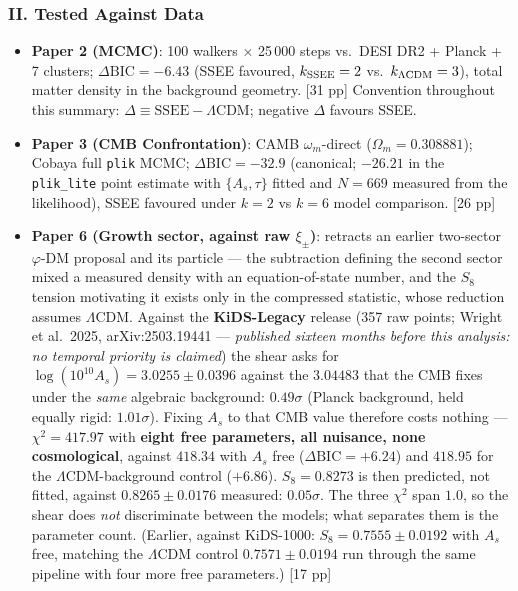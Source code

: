 \documentclass[11pt,a4paper]{article}
\begin{document}
\subsubsection*{II. Tested Against Data}
\begin{itemize}
  \item \textbf{Paper 2 (MCMC)}: 100 walkers $\times$ 25\,000 steps vs.\ DESI DR2 + Planck + 7 clusters; $\Delta\text{BIC}=-6.43$ (SSEE favoured, $k_{\rm SSEE}=2$ vs.\ $k_{\Lambda\rm CDM}=3$), total matter density in the background geometry. [31 pp] Convention throughout this summary: $\Delta\equiv\mathrm{SSEE}-\Lambda\mathrm{CDM}$; negative $\Delta$ favours SSEE.
  \item \textbf{Paper 3 (CMB Confrontation)}: CAMB $\omega_m$-direct ($\Omega_m=0.308881$); Cobaya full \texttt{plik} MCMC; $\Delta\mathrm{BIC}=-32.9$ (canonical; $-26.21$ in the \texttt{plik\_lite} point estimate with $\{A_s,\tau\}$ fitted and $N=669$ measured from the likelihood), SSEE favoured under $k=2$ vs $k=6$ model comparison. [26 pp]
  \item \textbf{Paper 6 (Growth sector, against raw $\xi_\pm$)}: retracts an
  earlier two-sector $\varphi$-DM proposal and its particle --- the subtraction
  defining the second sector mixed a measured density with an
  equation-of-state number, and the $S_8$ tension motivating it exists only in
  the compressed statistic, whose reduction assumes $\Lambda$CDM. Against the
  \textbf{KiDS-Legacy} release (357 raw points; Wright et al.\ 2025,
  arXiv:2503.19441 --- \emph{published sixteen months before this analysis: no
  temporal priority is claimed}) the shear asks for
  $\log(10^{10}A_s)=3.0255\pm0.0396$ against the $3.04483$ that the CMB fixes
  under the \emph{same} algebraic background: $0.49\sigma$ (Planck background,
  held equally rigid: $1.01\sigma$). Fixing $A_s$ to that CMB value therefore
  costs nothing --- $\chi^2=417.97$ with \textbf{eight free parameters, all
  nuisance, none cosmological}, against $418.34$ with $A_s$ free
  ($\Delta\mathrm{BIC}=+6.24$) and $418.95$ for the $\Lambda$CDM-background
  control ($+6.86$). $S_8=0.8273$ is then predicted, not fitted, against
  $0.8265\pm0.0176$ measured: $0.05\sigma$. The three $\chi^2$ span $1.0$, so
  the shear does \emph{not} discriminate between the models; what separates
  them is the parameter count. (Earlier, against KiDS-1000: $S_8=0.7555\pm0.0192$
  with $A_s$ free, matching the $\Lambda$CDM control $0.7571\pm0.0194$ run
  through the same pipeline with four more free parameters.) [17 pp]
\end{itemize}
\end{document}
